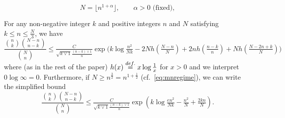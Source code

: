 \documentclass[10pt,a4paper]{amsart}
\begin{document}
\begin{equation}\label{eq:mnregime}
N = \lfloor n^{1+\alpha}\rfloor,\qquad \alpha > 0 \mbox{ (fixed)},
\end{equation}

\begin{lemma}\label{lem:factorial}
For any non-negative integer $k$ and positive integers $n$ and $N$ satisfying $k 
\le n \le \tfrac N 3$, we have
\begin{equation}\label{eq:factorial_dense}
\frac{\binom{n}{k}\binom{N - n}{n - k}}{\binom{N}{n}} \le \tfrac{C}{\sqrt{k \vee 1}\frac {(n-k)\vee1} n}\exp\big(k \log \tfrac{n^2}{Nk} - 2Nh(\tfrac{N-n}N) + 2n h(\tfrac {n - k}n) + Nh(\tfrac{N - 2n + k}N)\big)
\end{equation}
where (as in the rest of the paper) $h(x) \stackrel{{\rm def.}}{=} x \log \tfrac 1x$ for $x > 0$ and we 
interpret $0\log \infty = 0$. Furthermore, if $N \ge n^{\frac32} = n^{1 + 
\frac12}$ (cf.~\eqref{eq:mnregime}), we can write the simplified bound
\begin{equation}\label{eq:factorial}
  \frac{\binom{n}{k}\binom{N - n}{n - k}}{\binom{N}{n}} \le \tfrac{C}{\sqrt{k \vee 1}\frac {(n-k)\vee1} n}\exp(k\log \tfrac {en^2}{Nk} -\tfrac{n^2}N + \tfrac{2kn}N).
\end{equation}
\end{lemma}
\end{document}

